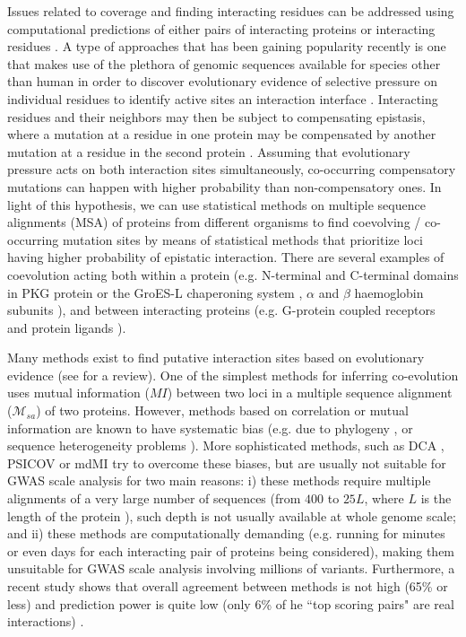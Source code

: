 Issues related to coverage and finding interacting residues can be addressed using computational predictions of either pairs of interacting proteins or interacting residues \cite{Shoemaker2007}. A type of approaches that has been gaining popularity recently is one that makes use of the plethora of genomic sequences available for species other than human in order to discover evolutionary evidence of selective pressure on individual residues to identify active sites an  interaction interface \cite{marks2012protein}. Interacting residues and their neighbors may then be subject to compensating epistasis, where a mutation at a residue in one protein may be compensated by another mutation at a residue in the second protein \cite{Pazos1997}. Assuming that evolutionary pressure acts on both interaction sites simultaneously, co-occurring compensatory mutations can happen with higher probability than non-compensatory ones. In light of this hypothesis, we can use statistical methods on multiple sequence alignments (MSA) of proteins from different organisms to find coevolving / co-occurring mutation sites by means of statistical methods that prioritize loci having higher probability of epistatic interaction. There are several examples of coevolution acting both within a protein (e.g. N-terminal and C-terminal domains in PKG protein \cite{Goh2000} or the GroES-L chaperoning system \cite{Ruiz2013}, $\alpha$ and $\beta$ haemoglobin subunits \cite{Pazos1997}), and between interacting proteins (e.g. G-protein coupled receptors and protein ligands \cite{Goh2000}).

Many methods exist to find putative interaction sites based on evolutionary evidence (see \cite{Juan2013} for a review). One of the simplest methods for inferring co-evolution uses mutual information ($MI$) between two loci \cite{marks2012protein} in a multiple sequence alignment ($\mathcal{M}_{sa}$) of two proteins. However, methods based on correlation or mutual information are known to have systematic bias (e.g. due to phylogeny \cite{REF}, or sequence heterogeneity problems \cite{REF}). More sophisticated methods, such as DCA \cite{REF}, PSICOV \cite{REF} or mdMI \cite{REF} try to overcome these biases, but are usually not suitable for GWAS scale analysis for two main reasons: i) these methods require multiple alignments of a very large number of sequences (from $400$ to $25L$, where $L$ is the length of the protein \cite{REF}), such depth is not usually available at whole genome scale; and ii) these methods are computationally demanding (e.g. running for minutes or even days for each interacting pair of proteins being considered), making them unsuitable for GWAS scale analysis involving millions of variants. Furthermore, a recent study shows that overall agreement between methods is not high (65\% or less) and prediction power is quite low (only 6\% of he ``top scoring pairs" are real interactions) \cite{REF}.

